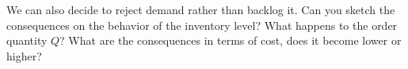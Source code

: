 \begin{exercise}We can also decide to reject demand rather than
  backlog it. Can you sketch the consequences on the behavior of the
  inventory level?  What happens to the order quantity $Q$?  What are
  the consequences in terms of cost, does it become lower or higher?

\end{exercise}
